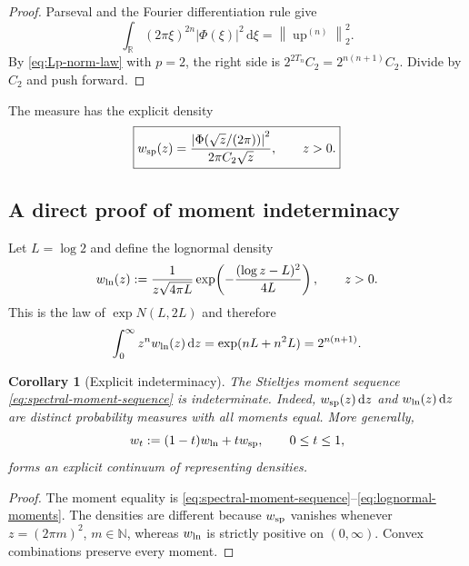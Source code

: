\documentclass[11pt,oneside]{article}
\numberwithin{equation}{section}
\theoremstyle{plain}
\newtheorem{corollary}[theorem]{Corollary}
\theoremstyle{definition}
\theoremstyle{remark}
\newcommand{\R}{\mathbb R}
\newcommand{\N}{\mathbb N}
\newcommand{\Up}{\operatorname{up}}
\newcommand{\dd}{\,\mathrm d}
\newcommand{\norm}[1]{\left\lVert#1\right\rVert}
\begin{document}
\begin{proof}
Parseval and the Fourier differentiation rule give
\[
 \int_{\R}(2\pi\xi)^{2n}|\Phi(\xi)|^2\dd\xi
 =\norm{\Up^{(n)}}_2^2.
\]
By \eqref{eq:Lp-norm-law} with $p=2$, the right side is
$2^{2T_n}C_2=2^{n(n+1)}C_2$.  Divide by $C_2$ and push forward.
\end{proof}

The measure has the explicit density
\begin{equation}
 \boxed{
 w_{\rm sp}(z)
 =\frac{\left|\Phi\!\left(\sqrt z/(2\pi)\right)\right|^2}
 {2\pi C_2\sqrt z},
 \qquad z>0.}
 \label{eq:spectral-density}
\end{equation}

\subsection{A direct proof of moment indeterminacy}

Let $L=\log2$ and define the lognormal density
\begin{equation}
 w_{\rm ln}(z)
 :=\frac1{z\sqrt{4\pi L}}
 \exp\!\left(-\frac{(\log z-L)^2}{4L}\right),
 \qquad z>0.
 \label{eq:lognormal-density}
\end{equation}
This is the law of $\exp N(L,2L)$ and therefore
\begin{equation}
 \int_0^\infty z^n w_{\rm ln}(z)\dd z
 =\exp(nL+n^2L)=2^{n(n+1)}.
 \label{eq:lognormal-moments}
\end{equation}

\begin{corollary}[Explicit indeterminacy]
\label{cor:moment-indeterminacy}
The Stieltjes moment sequence \eqref{eq:spectral-moment-sequence} is indeterminate.
Indeed, $w_{\rm sp}(z)\dd z$ and $w_{\rm ln}(z)\dd z$ are distinct probability measures with
all moments equal.  More generally,
\begin{equation}
 w_t:=(1-t)w_{\rm ln}+tw_{\rm sp},\qquad0\leq t\leq1,
 \label{eq:convex-measures}
\end{equation}
forms an explicit continuum of representing densities.
\end{corollary}

\begin{proof}
The moment equality is \eqref{eq:spectral-moment-sequence}--\eqref{eq:lognormal-moments}.
The densities are different because $w_{\rm sp}$ vanishes whenever
$z=(2\pi m)^2$, $m\in\N$, whereas $w_{\rm ln}$ is strictly positive on $(0,\infty)$.
Convex combinations preserve every moment.
\end{proof}
\end{document}
